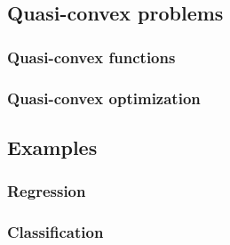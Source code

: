 \subsection{Quasi-convex problems}
\subsubsection{Quasi-convex functions}
\subsubsection{Quasi-convex optimization}
\subsection{Examples}
\subsubsection{Regression}
\subsubsection{Classification}